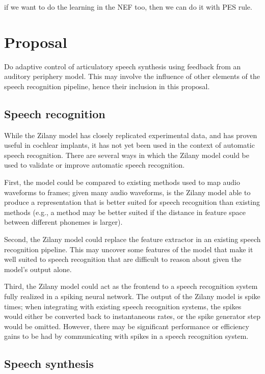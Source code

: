 \documentclass{article}
\begin{document}
if we want to do the learning in the NEF too,
then we can do it with PES rule.

\section{Proposal}

Do adaptive control of
articulatory speech synthesis
using feedback from
an auditory periphery model.
This may involve the influence
of other elements
of the speech recognition pipeline,
hence their inclusion in this proposal.

\subsection{Speech recognition}

While the Zilany model
has closely replicated experimental data,
and has proven useful in cochlear implants,
it has not yet been used in the context
of automatic speech recognition.
There are several ways in which
the Zilany model could be used
to validate or improve automatic speech recognition.

First, the model could be compared
to existing methods used to map
audio waveforms to frames;
given many audio waveforms,
is the Zilany model able to
produce a representation that
is better suited for speech recognition
than existing methods
(e.g., a method may be better suited
if the distance in feature space
between different phonemes is larger).

Second, the Zilany model could
replace the feature extractor
in an existing speech recognition pipeline.
This may uncover some features
of the model that make it well suited
to speech recognition that
are difficult to reason about
given the model's output alone.

Third, the Zilany model could
act as the frontend to a
speech recognition system
fully realized in a spiking neural network.
The output of the Zilany model
is spike times;
when integrating with existing
speech recognition systems,
the spikes would either be
converted back to instantaneous rates,
or the spike generator step
would be omitted.
However, there may be significant performance
or efficiency gains to be had
by communicating with spikes
in a speech recognition system.

\subsection{Speech synthesis}
\end{document}
